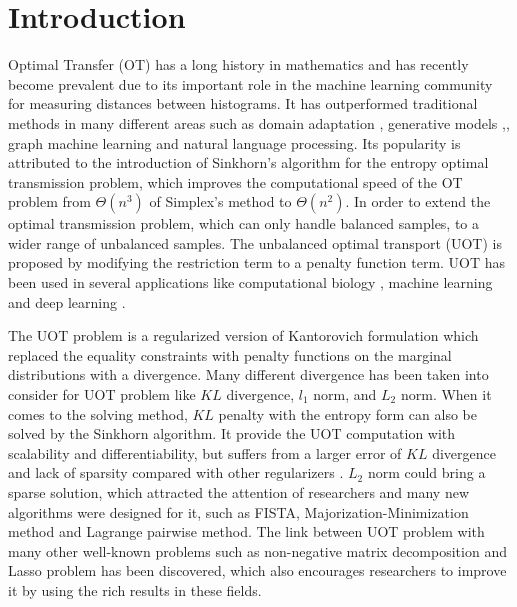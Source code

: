 \section{Introduction}

Optimal Transfer (OT) has a long history in mathematics and has recently become prevalent due to its important role in the machine learning community for measuring distances between histograms. It has outperformed traditional methods in many different areas such as domain adaptation  \citep{7586038}, generative models \citep{arjovsky2017wasserstein},, graph machine learning \citep{NEURIPS2019_fdd5b16f} and natural language processing.  \citep{084adf2f555549c493e0331a00e4ecad} Its popularity is attributed to the introduction of Sinkhorn's algorithm for the entropy optimal transmission problem, \citep{NIPS2013_af21d0c9} which improves the computational speed of the OT problem from $\Theta (n^3)$ of Simplex's method to $\Theta (n^2)$. In order to extend the optimal transmission problem, which can only handle balanced samples, to a wider range of unbalanced samples. The unbalanced optimal transport (UOT) is proposed by modifying the restriction term to a penalty function term. UOT has been used in several applications like computational biology\citep{SCHIEBINGER2019928} , machine learning \citep{DBLP:conf/aistats/JanatiCG19} and deep learning \citep{DBLP:conf/iclr/YangU19}. 

The UOT problem is a regularized version of Kantorovich formulation which replaced the equality constraints with penalty functions on the marginal distributions with a divergence. Many different divergence has been taken into consider for UOT problem like $KL$ divergence, $l_1$ norm, and $L_2$ norm. When it comes to the solving method, $KL$ penalty with the entropy form can also be solved by the Sinkhorn algorithm. It provide the UOT computation with scalability and differentiability, but suffers from a larger error of $KL$ divergence and lack of sparsity compared with other regularizers \citep{DBLP:conf/aistats/BlondelSR18}. $L_2$ norm could bring a sparse solution, which attracted the attention of researchers and many new algorithms were designed for it, such as FISTA, Majorization-Minimization method and Lagrange pairwise method. \citep{NEURIPS2021_c3c617a9} The link between UOT problem with many other well-known problems such as non-negative matrix decomposition and Lasso problem has been discovered, which also encourages researchers to improve it by using the rich results in these fields.

